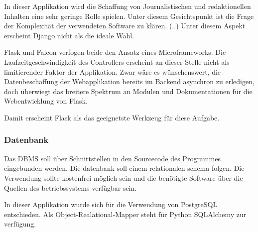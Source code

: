 In dieser Applikation wird die Schaffung von Journalistischen und redaktionellen Inhalten eine sehr geringe Rolle spielen. Unter diesem Gesichtspunkt ist die Frage der Komplexität der verwendeten Software zu klären. (..) Unter diesem Aspekt erscheint Django nicht als die ideale Wahl.

Flask und Falcon verfogen beide den Ansatz eines Microframeworks. Die Laufzeitgeschwindigkeit des Controllers erscheint an dieser Stelle nicht als limitierender Faktor der Applikation. Zwar wäre es wünschenswert, die Datenbeschaffung der Webapplikation bereits im Backend asynchron zu erledigen, doch überwiegt das breitere Spektrum an Modulen und Dokumentationen für die Webentwicklung von Flask.

Damit erscheint Flask als das geeignetste Werkzeug für diese Aufgabe.


\subsubsection{Datenbank}

Das DBMS soll über Schnittstellen in den Sourcecode des Programmes eingebunden werden. Die datenbank soll einem relationalen schema folgen. Die Verwendung sollte kostenfrei möglich sein und die benötigte Software über die Quellen des betriebssystems verfügbar sein. 

In dieser Applikation wurde sich für die Verwendung von PostgreSQL entschieden. Als Object-Realational-Mapper steht für Python SQLAlchemy zur verfügung.


